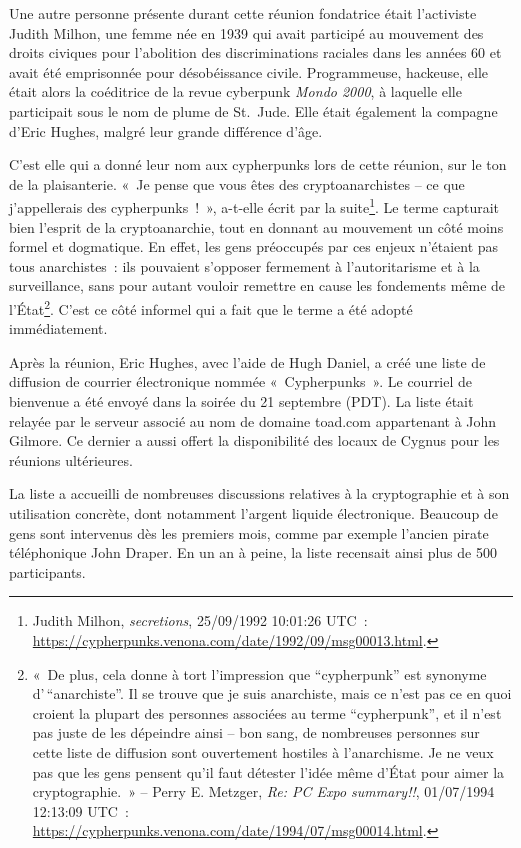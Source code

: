 \documentclass[
  a5paper,
  smalldemyvopaper,10pt,twoside,onecolumn,openright,extrafontsizes,hidelinks]{memoir}
\begin{document}
Une autre personne présente durant cette réunion fondatrice était
l'activiste Judith Milhon, une femme née en 1939 qui avait participé au
mouvement des droits civiques pour l'abolition des discriminations
raciales dans les années 60 et avait été emprisonnée pour désobéissance
civile. Programmeuse, hackeuse, elle était alors la coéditrice de la
revue cyberpunk \emph{Mondo 2000}, à laquelle elle participait sous le
nom de plume de St.~Jude. Elle était également la compagne d'Eric
Hughes, malgré leur grande différence d'âge.

C'est elle qui a donné leur nom aux cypherpunks lors de cette réunion,
sur le ton de la plaisanterie. «~Je pense que vous êtes des
cryptoanarchistes -- ce que j'appellerais des cypherpunks~!~», a-t-elle
écrit par la suite\footnote{Judith Milhon, \emph{secretions}, 25/09/1992
  10:01:26 UTC~:
  \url{https://cypherpunks.venona.com/date/1992/09/msg00013.html}.}. Le
terme capturait bien l'esprit de la cryptoanarchie, tout en donnant au
mouvement un côté moins formel et dogmatique. En effet, les gens
préoccupés par ces enjeux n'étaient pas tous anarchistes~: ils pouvaient
s'opposer fermement à l'autoritarisme et à la surveillance, sans pour
autant vouloir remettre en cause les fondements même de
l'État\footnote{«~De plus, cela donne à tort l'impression que
  ``cypherpunk'' est synonyme d'\,``anarchiste''. Il se trouve que je
  suis anarchiste, mais ce n'est pas ce en quoi croient la plupart des
  personnes associées au terme ``cypherpunk'', et il n'est pas juste de
  les dépeindre ainsi -- bon sang, de nombreuses personnes sur cette
  liste de diffusion sont ouvertement hostiles à l'anarchisme. Je ne
  veux pas que les gens pensent qu'il faut détester l'idée même d'État
  pour aimer la cryptographie.~» -- Perry E. Metzger, \emph{Re: PC Expo
  summary!!}, 01/07/1994 12:13:09 UTC~:
  \url{https://cypherpunks.venona.com/date/1994/07/msg00014.html}.}.
C'est ce côté informel qui a fait que le terme a été adopté
immédiatement.

Après la réunion, Eric Hughes, avec l'aide de Hugh Daniel, a créé une
liste de diffusion de courrier électronique nommée «~Cypherpunks~». Le
courriel de bienvenue a été envoyé dans la soirée du 21 septembre (PDT).
La liste était relayée par le serveur associé au nom de domaine toad.com
appartenant à John Gilmore. Ce dernier a aussi offert la disponibilité
des locaux de Cygnus pour les réunions ultérieures.

La liste a accueilli de nombreuses discussions relatives à la
cryptographie et à son utilisation concrète, dont notamment l'argent
liquide électronique. Beaucoup de gens sont intervenus dès les premiers
mois, comme par exemple l'ancien pirate téléphonique John Draper. En un
an à peine, la liste recensait ainsi plus de 500 participants.
\end{document}
